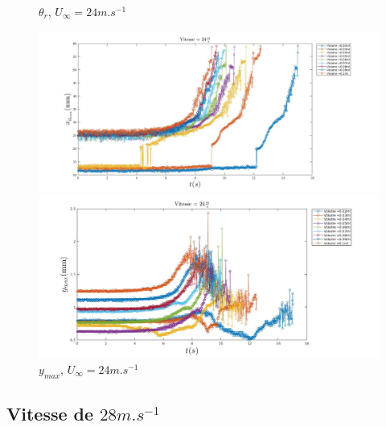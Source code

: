 \begin{figure}[!h]
\begin{minipage}{0.8\linewidth}
	\caption{$\theta_{r}$, $U_{\infty}=24m.s^{-1}$}
		\label{fig:v=24or_2}
	\end{minipage}
\end{figure}

\begin{figure}[!h]
	\centering
	\begin{minipage}{0.8\linewidth}
	\includegraphics[width = \linewidth]{./image/v=24xm.jpg}
	\caption{$x_{max}$, $U_{\infty}=24m.s^{-1}$}
		\label{fig:v=24xm}
	\end{minipage}
	\begin{minipage}{0.8\linewidth}
	\includegraphics[width = \linewidth]{./image/v=24ym.jpg}
	\caption{$y_{max}$, $U_{\infty}=24m.s^{-1}$}
	\end{minipage}
		\label{fig:v=24ym}
\end{figure}

\subsection{Vitesse de $28m.s^{-1}$}

